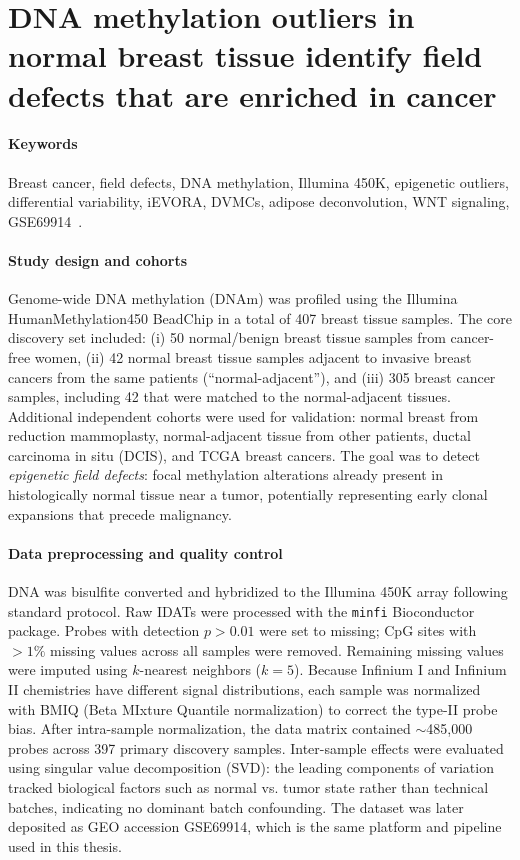 \documentclass[10pt]{extarticle}
\begin{document}
\section{DNA methylation outliers in normal breast tissue identify field defects that are enriched in cancer}


\paragraph{Keywords}
Breast cancer, field defects, DNA methylation, Illumina 450K, epigenetic outliers, differential variability, iEVORA, DVMCs, adipose deconvolution, WNT signaling, GSE69914~\cite{teschendorff2016fielddefects}.

\paragraph{Study design and cohorts}
Genome-wide DNA methylation (DNAm) was profiled using the Illumina HumanMethylation450 BeadChip in a total of 407 breast tissue samples. The core discovery set included: (i) 50 normal/benign breast tissue samples from cancer-free women, (ii) 42 normal breast tissue samples adjacent to invasive breast cancers from the same patients (``normal-adjacent''), and (iii) 305 breast cancer samples, including 42 that were matched to the normal-adjacent tissues. Additional independent cohorts were used for validation: normal breast from reduction mammoplasty, normal-adjacent tissue from other patients, ductal carcinoma in situ (DCIS), and TCGA breast cancers. The goal was to detect \textit{epigenetic field defects}: focal methylation alterations already present in histologically normal tissue near a tumor, potentially representing early clonal expansions that precede malignancy.

\paragraph{Data preprocessing and quality control}
DNA was bisulfite converted and hybridized to the Illumina 450K array following standard protocol. Raw IDATs were processed with the \texttt{minfi} Bioconductor package. Probes with detection $p > 0.01$ were set to missing; CpG sites with $>1\%$ missing values across all samples were removed. Remaining missing values were imputed using $k$-nearest neighbors ($k=5$). Because Infinium I and Infinium II chemistries have different signal distributions, each sample was normalized with BMIQ (Beta MIxture Quantile normalization) to correct the type-II probe bias. After intra-sample normalization, the data matrix contained $\sim$485{,}000 probes across 397 primary discovery samples. Inter-sample effects were evaluated using singular value decomposition (SVD): the leading components of variation tracked biological factors such as normal vs. tumor state rather than technical batches, indicating no dominant batch confounding. The dataset was later deposited as GEO accession GSE69914, which is the same platform and pipeline used in this thesis.
\end{document}
